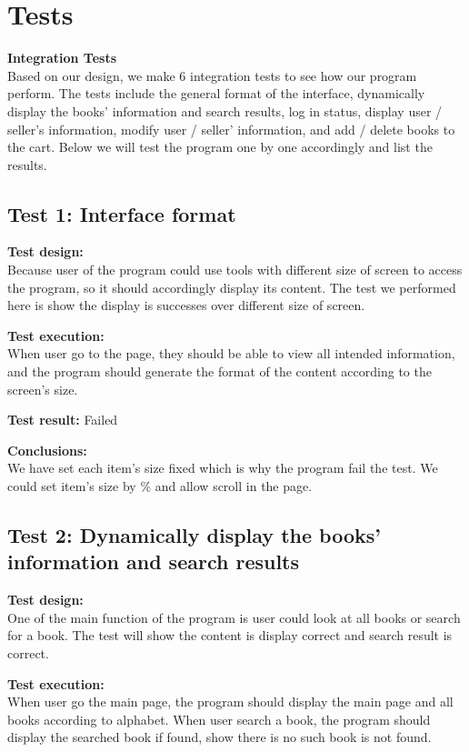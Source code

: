 \documentclass[12pt]{article}
\begin{document}
	\section{Tests}
	\textbf{Integration Tests} \\
	Based on our design, we make 6 integration tests to see how our program perform. The tests include the general format of the interface, dynamically display the books’ information and search results, log in status, display user / seller’s information, modify user / seller’ information, and add / delete books to the cart. Below we will test the program one by one accordingly and list the results.


	\subsection{Test 1: Interface format}

	\textbf{Test design:} \\
	Because user of the program could use tools with different size of screen to access the program, so it should accordingly display its content. The test we performed here is show the display is successes over different size of screen.

	\textbf{Test execution:} \\
	When user go to the page, they should be able to view all intended information, and the program should generate the format of the content according to the screen’s size.

	\textbf{Test result: } Failed

	\textbf{Conclusions:} \\
	We have set each item’s size fixed which is why the program fail the test. We could set item’s size by \% and allow scroll in the page.


	\subsection{Test 2: Dynamically display the books' information and search results}

	\textbf{Test design:} \\
	One of the main function of the program is user could look at all books or search for a book. The test will show the content is display correct and search result is correct.

	\textbf{Test execution:} \\
	When user go the main page, the program should display the main page and all books according to alphabet. When user search a book, the program should display the searched book if found, show there is no such book is not found.
\end{document}
